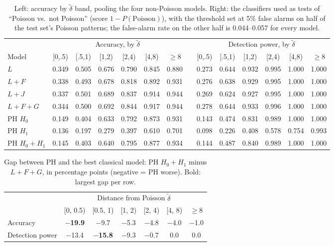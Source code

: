 \documentclass[10pt,a4paper]{article}
\newcommand{\dtil}{\tilde\delta}
\newcommand{\B}[1]{\textbf{#1}}
\begin{document}
\begin{table}[H]
\centering\footnotesize\setlength{\tabcolsep}{3.5pt}
\begin{tabular}{@{}l cccccc c cccccc@{}}
\toprule
 & \multicolumn{6}{c}{Accuracy, by $\dtil$} & & \multicolumn{6}{c}{Detection power, by $\dtil$}\\
\cmidrule(lr){2-7}\cmidrule(l){9-14}
Model & [0,.5) & [.5,1) & [1,2) & [2,4) & [4,8) & $\ge$8 & & [0,.5) & [.5,1) & [1,2) & [2,4) & [4,8) & $\ge$8\\
\midrule
$L$ & 0.349 & 0.505 & 0.676 & 0.790 & 0.845 & 0.880 & & 0.273 & 0.644 & 0.932 & 0.995 & 1.000 & 1.000\\
$L{+}F$ & 0.338 & 0.493 & 0.678 & 0.818 & 0.892 & 0.931 & & 0.276 & 0.638 & 0.929 & 0.995 & 1.000 & 1.000\\
$L{+}J$ & 0.337 & 0.501 & 0.689 & 0.837 & 0.914 & 0.944 & & 0.269 & 0.624 & 0.927 & 0.995 & 1.000 & 1.000\\
$L{+}F{+}G$ & 0.344 & 0.500 & 0.692 & 0.844 & 0.917 & 0.944 & & 0.278 & 0.644 & 0.933 & 0.996 & 1.000 & 1.000\\
\midrule
PH $H_0$ & 0.149 & 0.404 & 0.633 & 0.792 & 0.873 & 0.931 & & 0.143 & 0.474 & 0.831 & 0.989 & 1.000 & 1.000\\
PH $H_1$ & 0.136 & 0.197 & 0.279 & 0.397 & 0.610 & 0.701 & & 0.098 & 0.226 & 0.408 & 0.578 & 0.754 & 0.993\\
PH $H_0{+}H_1$ & 0.145 & 0.403 & 0.640 & 0.795 & 0.877 & 0.934 & & 0.144 & 0.487 & 0.840 & 0.989 & 1.000 & 1.000\\
\bottomrule
\end{tabular}
\caption{Left: accuracy by $\dtil$ band, pooling the four non-Poisson models. Right: the classifiers used as tests of ``Poisson vs.\ not Poisson'' (score $1-P(\text{Poisson})$), with the threshold set at 5\% false alarms on half of the test set's Poisson patterns; the false-alarm rate on the other half is 0.044--0.057 for every model.}
\label{tab:classify-delta}
\end{table}

\begin{table}[H]
\centering\small
\begin{tabular}{@{}l cccccc@{}}
\toprule
 & \multicolumn{6}{c}{Distance from Poisson $\dtil$}\\
\cmidrule(l){2-7}
 & [0, 0.5) & [0.5, 1) & [1, 2) & [2, 4) & [4, 8) & $\ge 8$\\
\midrule
Accuracy & \B{$-$19.9} & $-$9.7 & $-$5.3 & $-$4.8 & $-$4.0 & $-$1.0\\
Detection power & $-$13.4 & \B{$-$15.8} & $-$9.3 & $-$0.7 & 0.0 & 0.0\\
\bottomrule
\end{tabular}
\caption{Gap between PH and the best classical model: PH $H_0{+}H_1$ minus $L{+}F{+}G$, in percentage points (negative = PH worse). Bold: largest gap per row.}
\label{tab:classify-gap}
\end{table}
\end{document}
